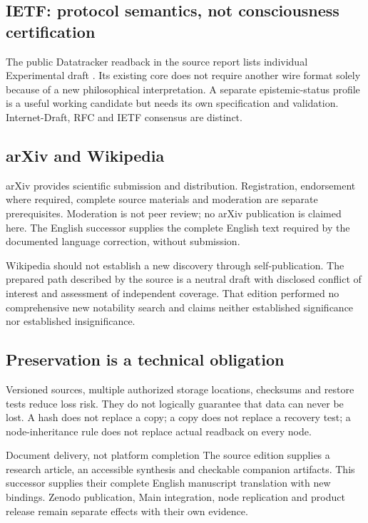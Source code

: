 \begin{cols}
\subsection*{IETF: protocol semantics, not consciousness certification}
The public Datatracker readback in the source report lists individual Experimental draft . Its existing core does not require another wire format solely because of a new philosophical interpretation. A separate epistemic-status profile is a useful working candidate but needs its own specification and validation. Internet-Draft, RFC and IETF consensus are distinct. 

\subsection*{arXiv and Wikipedia}
arXiv provides scientific submission and distribution. Registration, endorsement where required, complete source materials and moderation are separate prerequisites. Moderation is not peer review; no arXiv publication is claimed here. The English successor supplies the complete English text required by the documented language correction, without submission. 

Wikipedia should not establish a new discovery through self-publication. The prepared path described by the source is a neutral draft with disclosed conflict of interest and assessment of independent coverage. That edition performed no comprehensive new notability search and claims neither established significance nor established insignificance. 

\subsection*{Preservation is a technical obligation}
Versioned sources, multiple authorized storage locations, checksums and restore tests reduce loss risk. They do not logically guarantee that data can never be lost. A hash does not replace a copy; a copy does not replace a recovery test; a node-inheritance rule does not replace actual readback on every node.

\begin{boundary}{Document delivery, not platform completion}
The source edition supplies a research article, an accessible synthesis and checkable companion artifacts. This successor supplies their complete English manuscript translation with new bindings. Zenodo publication, Main integration, node replication and product release remain separate effects with their own evidence.
\end{boundary}
\end{cols}
